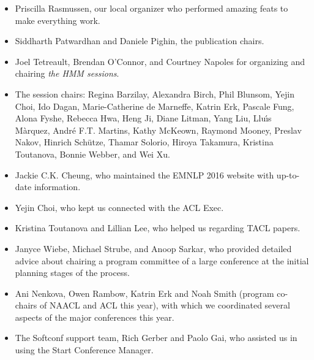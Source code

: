 \begin{itemize}
\item Priscilla Rasmussen, our local organizer who performed amazing feats to make everything work.
\item Siddharth Patwardhan and Daniele Pighin, the publication chairs.
\item Joel Tetreault, Brendan O'Connor, and Courtney Napoles for organizing and chairing {\em the HMM sessions}. 
\item The session chairs:
%
  Regina Barzilay, 
  Alexandra Birch, 
  Phil Blunsom,
  Yejin Choi,
  Ido Dagan,
  Marie-Catherine de Marneffe,
  Katrin Erk,
  Pascale Fung, 
  Alona Fyshe,
  Rebecca Hwa,
  Heng Ji,
  Diane Litman, 
  Yang Liu,
  Llu{\'\i}s M{\`a}rquez,
  Andr{\'e} F.T. Martins,
  Kathy McKeown, 
  Raymond Mooney,
  Preslav Nakov,
  Hinrich Sch{\"u}tze,
  Thamar Solorio,
  Hiroya Takamura,
  Kristina Toutanova,
  Bonnie Webber,
  and Wei Xu. 
%  
\item Jackie C.K. Cheung, who maintained the EMNLP 2016 website with up-to-date information. 
\item Yejin Choi, who kept us connected with the ACL Exec. 
\item Kristina Toutanova and Lillian Lee, who helped us regarding TACL papers.
\item Janyce Wiebe, Michael Strube, and Anoop Sarkar, who provided detailed advice about chairing a program committee of a large conference  at the initial planning stages of the process.
\item Ani Nenkova, Owen Rambow, Katrin Erk and Noah Smith (program
  co-chairs of NAACL and ACL this year), with which we coordinated
  several aspects of the major conferences this year.
\item The Softconf support team, Rich Gerber and Paolo Gai, who assisted us in using
  the Start Conference Manager. 
    
\end{itemize}






